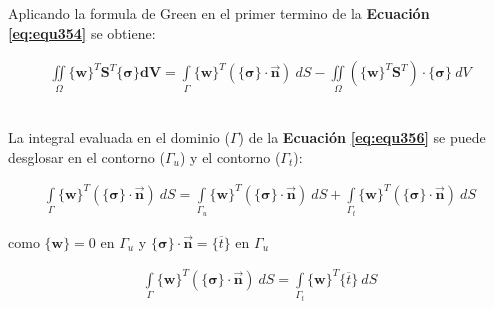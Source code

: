 Aplicando la formula de Green en el primer termino de la \textbf{Ecuación} \textbf{\ref{eq:equ354}} se obtiene:

\begin{ceqn} %
\begin{gather}\label{eq:equ357}
\iint \limits_\Omega \{\mathbf{w}\}^T \mathbf{S}^T\{\mathbf{\sigma}\} \mathbf{dV} = 
\int \limits_\Gamma \{\mathbf{w}\}^T(\{\mathbf{\sigma}\} \cdot \mathbf{\vec{n}})\ dS -
\iint \limits_\Omega (\{\mathbf{w}\}^T \mathbf{S}^T) \cdot \{\mathbf{\sigma}\}\ dV
\end{gather}   
\end{ceqn}
\\
La integral evaluada en el dominio ($\Gamma$) de la \textbf{Ecuación} \textbf{\ref{eq:equ356}} se puede desglosar en el contorno ($\Gamma_{u}$) y el contorno ($\Gamma_{t}$):

\begin{ceqn} %
\begin{gather}\label{eq:equ357}
\int \limits_\Gamma \{\mathbf{w}\}^T(\{\mathbf{\sigma}\} \cdot \mathbf{\vec{n}})\ dS =
\int \limits_{\Gamma_{u}} \{\mathbf{w}\}^T(\{\mathbf{\sigma}\} \cdot \mathbf{\vec{n}})\ dS +
\int \limits_{\Gamma_{t}} \{\mathbf{w}\}^T(\{\mathbf{\sigma}\} \cdot \mathbf{\vec{n}})\ dS
\end{gather}   
\end{ceqn}

como $\{\mathbf{w}\} = 0$ en $\Gamma_{u}$ y $\{\mathbf{\sigma}\}\cdot \mathbf{\vec{n}} = \{\overline{t}\}$ en $\Gamma_{u}$

\begin{ceqn} %
\begin{gather}\label{eq:equ358}
\int \limits_\Gamma \{\mathbf{w}\}^T(\{\mathbf{\sigma}\} \cdot \mathbf{\vec{n}})\ dS =
\int \limits_{\Gamma_{t}} \{\mathbf{w}\}^T \{\overline{t}\}\ dS
\end{gather}   
\end{ceqn}

